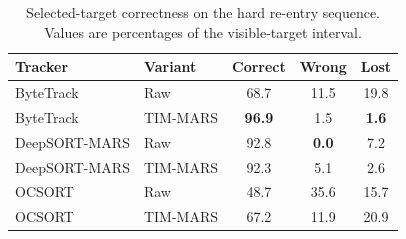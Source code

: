 \begin{table}[t]
\centering
\caption{Selected-target correctness on the hard re-entry sequence. Values are percentages of the visible-target interval.}
\label{tab:hard_reentry_results}
\begin{tabular}{llccc}
\toprule
Tracker & Variant & Correct & Wrong & Lost \\
\midrule
ByteTrack & Raw & 68.7 & 11.5 & 19.8 \\
ByteTrack & TIM-MARS & \textbf{96.9} & 1.5 & \textbf{1.6} \\
DeepSORT-MARS & Raw & 92.8 & \textbf{0.0} & 7.2 \\
DeepSORT-MARS & TIM-MARS & 92.3 & 5.1 & 2.6 \\
OCSORT & Raw & 48.7 & 35.6 & 15.7 \\
OCSORT & TIM-MARS & 67.2 & 11.9 & 20.9 \\
\bottomrule
\end{tabular}
\end{table}
